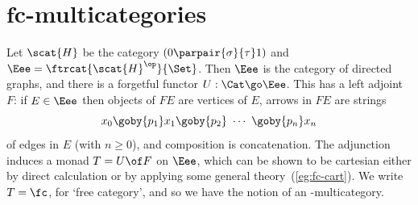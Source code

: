 \section{$\mathbf{fc}$-multicategories}


Let $\scat{H}$ be the category $(0 \parpair{\sigma}{\tau} 1)$ and $\Eee
= \ftrcat{\scat{H}^\op}{\Set}$.  Then $\Eee$ is the category of directed
graphs, and there is a forgetful functor $U: \Cat \go \Eee$.  This has a
left adjoint $F$: if $E \in \Eee$ then objects of $FE$ are vertices of $E$,
arrows in $FE$ are strings 
\[
x_0 \goby{p_1} x_1 \goby{p_2} \ \cdots\ \goby{p_n} x_n
\]
of edges in $E$ (with $n\geq 0$), and composition is concatenation.  The
adjunction induces a monad $T=U\of F$ on $\Eee$, which can be shown to be
cartesian either by direct calculation or by applying some general
theory~(\ref{eg:fc-cart}).  We write $T = \fc$,%
% 
%
%
%
% 
for `free category', and so
we have the notion of an \fc-multicategory.

